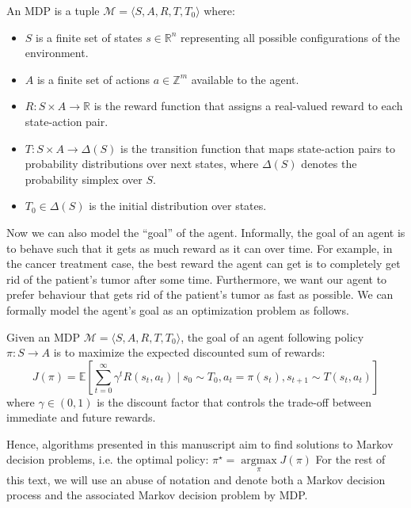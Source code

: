 \begin{definition} An MDP is a tuple $\mathcal{M} = \langle S, A, R, T, T_0 \rangle$ where:
\begin{itemize}
\item $S$ is a finite set of states $s \in \mathbb{R}^n$ representing all possible configurations of the environment.
\item $A$ is a finite set of actions $a \in \mathbb{Z}^m$ available to the agent.
\item $R: S \times A \rightarrow \mathbb{R}$ is the reward function that assigns a real-valued reward to each state-action pair.
\item $T: S \times A \rightarrow \Delta(S)$ is the transition function that maps state-action pairs to probability distributions over next states, where $\Delta(S)$ denotes the probability simplex over $S$.
\item $T_0 \in \Delta(S)$ is the initial distribution over states.
\end{itemize}
\end{definition}
Now we can also model the ``goal'' of the agent. Informally, the goal of an agent is to behave such that it gets as much reward as it can over time. For example, in the cancer treatment case, the best reward the agent can get is to completely get rid of the patient's tumor after some time. Furthermore, we want our agent to prefer behaviour that gets rid of the patient's tumor as fast as possible. We can formally model the agent's goal as an optimization problem as follows. %
\begin{definition} Given an MDP $\mathcal{M}=\langle S, A, R, T, T_0 \rangle$, the goal of an agent following policy $\pi: S \rightarrow A$ is to maximize the expected discounted sum of rewards:
$$J(\pi) = \mathbb{E}\left[\sum_{t=0}^{\infty} \gamma^t R(s_t, a_t) \mid s_0 \sim T_0, a_t = \pi(s_t), s_{t+1} \sim T(s_t, a_t)\right]$$
where $\gamma \in (0,1)$ is the discount factor that controls the trade-off between immediate and future rewards.
\end{definition}

Hence, algorithms presented in this manuscript aim to find solutions to Markov decision problems, i.e. the optimal policy: $\pi^\star =\underset{\pi}{\operatorname{argmax}}J(\pi)$
For the rest of this text, we will use an abuse of notation and denote both a Markov decision process and the associated Markov decision problem by MDP.

